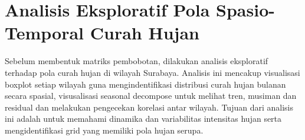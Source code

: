\section{Analisis Eksploratif Pola Spasio-Temporal Curah Hujan}
Sebelum membentuk matriks pembobotan, dilakukan analisis eksploratif terhadap pola curah hujan di wilayah Surabaya. 
Analisis ini mencakup visualisasi boxplot setiap wilayah guna mengindentifikasi distribusi curah hujan bulanan secara spasial, visusalisasi seasonal decompose untuk melihat tren, musiman dan residual dan melakukan pengecekan korelasi antar wilayah. 
Tujuan dari analisis ini adalah untuk memahami dinamika dan variabilitas intensitas hujan serta mengidentifikasi grid yang memiliki pola hujan serupa.